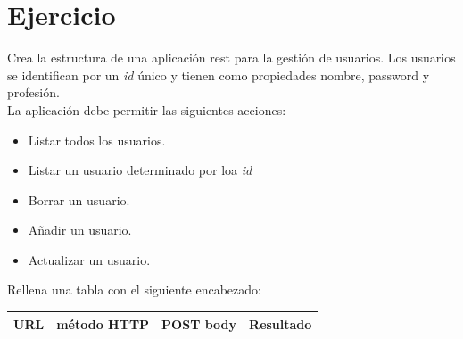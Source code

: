 \documentclass[4paper]{article}
\begin{document}
\section{Ejercicio}
Crea la estructura de una aplicación rest para la gestión de usuarios. Los usuarios se identifican por un \emph{id} único y tienen como propiedades nombre, password y profesión.
\\La aplicación debe permitir las siguientes acciones:
\begin{itemize}
\item Listar todos los usuarios.
\item Listar un usuario determinado por loa \emph{id}
\item Borrar un usuario.
\item Añadir un usuario.
\item Actualizar un usuario.
\end{itemize}
Rellena una tabla con el siguiente encabezado:\\
\begin{center}
\begin{tabular}{|c|c|c|c|}
\hline
{\Large URL} & {\Large método HTTP} & {\Large POST body} & {\Large Resultado}\\
\hline
\end{tabular}
\end{center}
\end{document}
